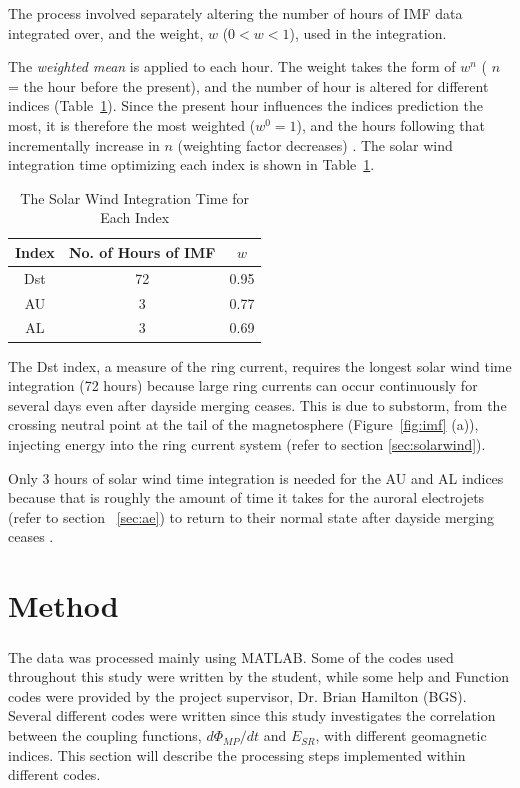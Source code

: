 \documentclass[12pt]{report} %
\begin{document}
The process involved separately altering the number of hours of IMF data integrated over, and the weight, $w$ ($0< w <1$), used in the integration.

The \emph{weighted mean} is applied to each hour. The weight takes the form of $w^n$ ( $n$ = the hour before the present), and the number of hour is altered for different indices (Table~\ref{tab:inttable}). Since the present hour influences the indices prediction the most, it is therefore the most weighted ($w^0 = 1$), and the hours following that incrementally increase in $n$ (weighting factor decreases) \citep{newell07}. The solar wind integration time optimizing each index is shown in Table~\ref{tab:inttable}.
  
\begin{table}[h]\small
\centering
\renewcommand{\arraystretch}{1.2}
\begin{tabular}{c c c}
\hline 
  Index  &  No. of Hours of IMF & $w$ \\
 \hline
Dst & 72 & 0.95 \\ 
AU& 3 & 0.77\\
AL & 3 & 0.69 \\
\hline
\end{tabular} \caption{The Solar Wind Integration Time for Each Index} \label{tab:inttable}
\end{table}

\vspace{0pt}
The Dst index, a measure of the ring current, requires the longest solar wind time integration (72 hours) because large ring currents can occur continuously for several days even after dayside merging ceases. This is due to substorm, from the crossing neutral point at the tail of the magnetosphere (Figure~\ref{fig:imf} (a)), injecting energy into the ring current system (refer to section \ref{sec:solarwind}). 

Only 3 hours of solar wind time integration is needed for the AU and AL indices because that is roughly the amount of time it takes for the auroral electrojets (refer to section ~\ref{sec:ae}) to return to their normal state after dayside merging ceases \citep{newell07}.


\chapter{Method}\label{chap:method}
\vspace{-20pt}
The data was processed mainly using MATLAB\textsuperscript{\textregistered}. Some of the codes used throughout this study were written by the student, while some help and Function codes were provided by the project supervisor, Dr. Brian Hamilton (BGS). Several different codes were written since this study investigates the correlation between the coupling functions, $d\Phi_{MP}/dt$ and $E_{SR}$, with different geomagnetic indices. This section will describe the processing steps implemented within different codes. 
\end{document}
